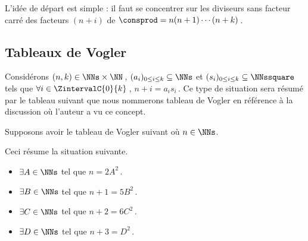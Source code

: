 L'idée de départ est simple : il faut se concentrer sur les diviseurs sans facteur carré des facteurs $(n + i)$ de $\consprod = n (n + 1) \cdots (n + k)$\,. 




\subsection{Tableaux de Vogler}


\begin{defi}
	Considérons $(n, k) \in \NNs \times \NN$\,,
	$( a_i )_{0 \leq i \leq k} \subseteq \NNs$
	et
	$( s_i )_{0 \leq i \leq k} \subseteq \NNssquare$
	tels que 
	$\forall i \in \ZintervalC{0}{k}$\,, $n + i = a_i s_i$\,.
	Ce type de situation sera résumé par le tableau suivant que nous nommerons tableau de Vogler en référence à la discussion où l'auteur a vu ce concept.

	\begin{center}
	\end{center}
\end{defi}




\begin{example}
	Supposons avoir le tableau de Vogler suivant où $n \in \NNs$.

	\begin{center}
	\end{center}
	
	Ceci résume la situation suivante. 
	
	\begin{itemize}
		\item $\exists A \in \NNs$ tel que $n     = 2 A^2$\,.

		\item $\exists B \in \NNs$ tel que $n + 1 = 5 B^2$\,.

		\item $\exists C \in \NNs$ tel que $n + 2 = 6 C^2$\,.

		\item $\exists D \in \NNs$ tel que $n + 3 = D^2  $\,.
	\end{itemize}
\end{example}


